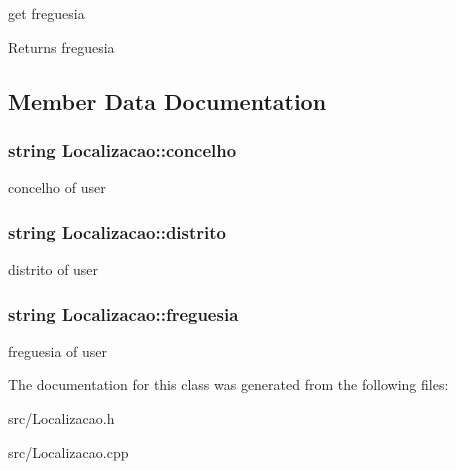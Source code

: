 get freguesia 

\begin{DoxyReturn}{Returns}
freguesia 
\end{DoxyReturn}


\subsection{Member Data Documentation}
\hypertarget{class_localizacao_a9100e2c4be0b28690e04621376799466}{}
\subsubsection[{concelho}]{\setlength{\rightskip}{0pt plus 5cm}string Localizacao\+::concelho\hspace{0.3cm}{\ttfamily [private]}}\label{class_localizacao_a9100e2c4be0b28690e04621376799466}
concelho of user \hypertarget{class_localizacao_a43dc8b8277fca7702fba41119b965a04}{}
\subsubsection[{distrito}]{\setlength{\rightskip}{0pt plus 5cm}string Localizacao\+::distrito\hspace{0.3cm}{\ttfamily [private]}}\label{class_localizacao_a43dc8b8277fca7702fba41119b965a04}
distrito of user \hypertarget{class_localizacao_a0868f113b0469e97191d5039c058ab11}{}
\subsubsection[{freguesia}]{\setlength{\rightskip}{0pt plus 5cm}string Localizacao\+::freguesia\hspace{0.3cm}{\ttfamily [private]}}\label{class_localizacao_a0868f113b0469e97191d5039c058ab11}
freguesia of user 

The documentation for this class was generated from the following files\+:\begin{DoxyCompactItemize}
\item 
src/Localizacao.\+h\item 
src/Localizacao.\+cpp\end{DoxyCompactItemize}
